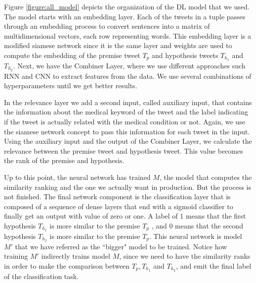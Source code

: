 \documentclass[12pt]{report}
\begin{document}

Figure \ref{figure:all_model} depicts the organization of the \ac{DL} model that we used.
The  model starts with an embedding layer. Each of the tweets in a tuple passes through an embedding process to convert sentences into a matrix of multidimensional vectors, each row representing words. This embedding layer is a modified siamese network since it is the same layer and weights are 
used to compute the embedding of the premise tweet $T_p$ and hypothesis tweets $T_{h_1}$ and $T_{h_2}$.  Next, we have the Combiner Layer, where we use different approaches such \ac{RNN} and \ac{CNN} to extract 
features from the data.
We use  several combinations of hyperparameters until we get better results.

In the relevance layer we add a second input, called auxiliary input, that contains the information about the medical keyword of the tweet and the label indicating if the tweet is actually related with the medical condition or not. Again, we use the siamese network concept to pass this information for each tweet in the input.
Using the auxiliary input and the output of the Combiner Layer, we calculate the relevance between the premise tweet and hypothesis tweet. This value becomes the rank of the premise and hypothesis. 

Up to this point, the neural network has trained $M$, the model that computes the similarity ranking and the one we
actually want in production. But  the process
is not finished.
The final network component is the classification layer that is composed of a sequence of dense layers that end with a sigmoid classifier to finally get an output with value of zero or one. A label of  1 means that the first hypothesis  $T_{h_1}$ is more similar to the premise $T_p$ , and 0 means that the second hypothesis
$T_{h_2}$ is more similar to the premise $T_p$. This neural network is model $M'$ that we have referred as the ``bigger" model to be trained. Notice how 
training $M'$ indirectly trains model $M$, since we need to have the similarity ranks in order to make the comparison between $T_p, T_{h_1}$ and $T_{h_2}$, and emit the final label of the classification task. 
\end{document}
